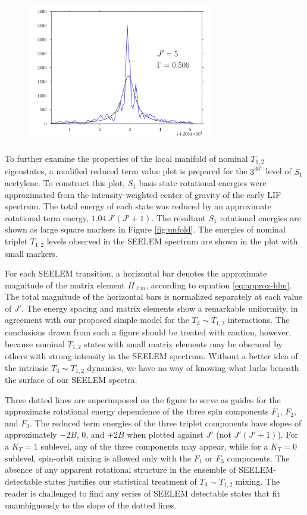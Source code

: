 \documentclass[12pt]{mitthesis}
\begin{document}
\begin{figure}
  \includegraphics[width=3.2in]{3361-q5-seelemfit}
\end{figure}


To further examine the properties of the local manifold of nominal
$T_{1,2}$ eigenstates, a modified reduced term value plot is prepared
for the $3^36^1$  level of $S_1$ acetylene.  To construct this
plot, $S_1$ basis state rotational energies were approximated from the
intensity-weighted center of gravity of the early LIF spectrum.  The
total energy of each state was reduced by an approximate rotational
term energy, $1.04 \: J'(J'+1)$.  The resultant $S_1$ rotational
energies are shown as large square markers in Figure \ref{fig:unfold}.
The energies of nominal triplet $T_{1,2}$ levels observed in the
SEELEM spectrum are shown in the plot with small markers.

For each SEELEM transition, a horizontal bar denotes the approximate
magnitude of the matrix element $H_{\ell m}$, according to equation
\ref{eq:approx-hlm}.  The total magnitude of the horizontal bars is
normalized separately at each value of $J'$.  The energy spacing and
matrix elements show a remarkable uniformity, in agreement with our
proposed simple model for the $T_3 \sim T_{1,2}$ interactions.  The
conclusions drawn from such a figure should be treated with caution,
however, because nominal $T_{1,2}$ states with small matrix elements
may be obscured by others with strong intensity in the SEELEM
spectrum.  Without a better idea of the intrinsic $T_3 \sim T_{1,2}$
dynamics, we have no way of knowing what lurks beneath the surface of
our SEELEM spectra.

Three dotted lines are superimposed on the figure to serve as guides
for the approximate rotational energy dependence of the three spin
components $F_1$, $F_2$, and $F_3$.  The reduced term energies of the
three triplet components have slopes of approximately $-2B$, 0, and
$+2B$ when plotted against $J'$ (not $J'(J'+1)$).  For a $K_T=1$
sublevel, any of the three components may appear, while for a $K_T=0$
sublevel, spin-orbit mixing is allowed only with the $F_1$ or $F_3$
components.  The absence of any apparent rotational structure in the
ensemble of SEELEM-detectable states justifies our statistical
treatment of $T_3 \sim T_{1,2}$ mixing.  The reader is challenged to
find any series of SEELEM detectable states that fit unambiguously to
the slope of the dotted lines.
\end{document}
